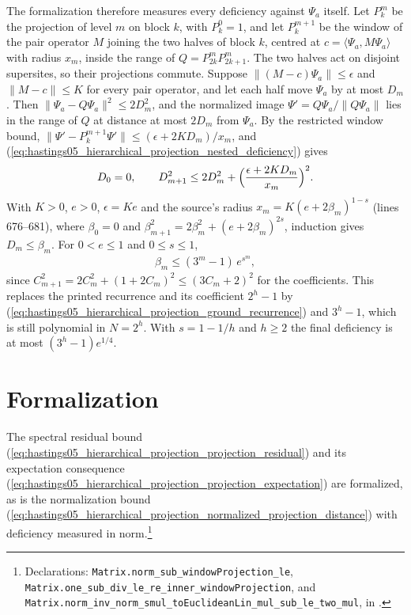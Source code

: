 \documentclass{article}
\providecommand{\leanid}[1]{\nolinkurl{#1}}
\begin{document}
The formalization therefore measures every deficiency against $\Psi_a$
itself. Let $P_k^m$ be the projection of level $m$ on block $k$, with
$P_k^0=1$, and let $P_k^{m+1}$ be the window of the pair operator $M$ joining
the two halves of block $k$, centred at $c=\langle\Psi_a,M\Psi_a\rangle$ with
radius $x_m$, inside the range of $Q=P_{2k}^mP_{2k+1}^m$. The two halves act
on disjoint supersites, so their projections commute. Suppose
$\lVert(M-c)\Psi_a\rVert\le\epsilon$ and $\lVert M-c\rVert\le K$ for every
pair operator, and let each half move $\Psi_a$ by at most $D_m$. Then
$\lVert\Psi_a-Q\Psi_a\rVert^2\le2D_m^2$, and the normalized image
$\Psi'=Q\Psi_a/\lVert Q\Psi_a\rVert$ lies in the range of $Q$ at distance at
most $2D_m$ from $\Psi_a$. By the restricted window bound,
$\lVert\Psi'-P_k^{m+1}\Psi'\rVert\le(\epsilon+2KD_m)/x_m$, and
(\ref{eq:hastings05_hierarchical_projection_nested_deficiency}) gives
\begin{align}\label{eq:hastings05_hierarchical_projection_ground_recurrence}
    D_0=0,\qquad
    D_{m+1}^2\le2D_m^2+\Bigl(\frac{\epsilon+2KD_m}{x_m}\Bigr)^2 .
\end{align}
With $K>0$, $e>0$, $\epsilon=Ke$ and the source's radius
$x_m=K(e+2\beta_m)^{1-s}$ (lines 676--681), where $\beta_0=0$ and
$\beta_{m+1}^2=2\beta_m^2+(e+2\beta_m)^{2s}$, induction gives
$D_m\le\beta_m$. For $0<e\le1$ and $0\le s\le1$,
\begin{align}\label{eq:hastings05_hierarchical_projection_ground_bound}
    \beta_m\le(3^m-1)\,e^{s^m},
\end{align}
since $C_{m+1}^2=2C_m^2+(1+2C_m)^2\le(3C_m+2)^2$ for the coefficients. This
replaces the printed recurrence and its coefficient $2^h-1$ by
(\ref{eq:hastings05_hierarchical_projection_ground_recurrence}) and $3^h-1$,
which is still polynomial in $N=2^h$. With $s=1-1/h$ and $h\ge2$ the final
deficiency is at most $(3^h-1)e^{1/4}$.

\section{Formalization}

The spectral residual bound (\ref{eq:hastings05_hierarchical_projection_projection_residual}) and its expectation consequence
(\ref{eq:hastings05_hierarchical_projection_projection_expectation}) are formalized, as is the normalization bound
(\ref{eq:hastings05_hierarchical_projection_normalized_projection_distance}) with deficiency measured in norm.\footnote{Declarations:
    \leanid{Matrix.norm_sub_windowProjection_le},
    \leanid{Matrix.one_sub_div_le_re_inner_windowProjection}, and
    \leanid{Matrix.norm_inv_norm_smul_toEuclideanLin_mul_sub_le_two_mul}, in
    .}
\end{document}

